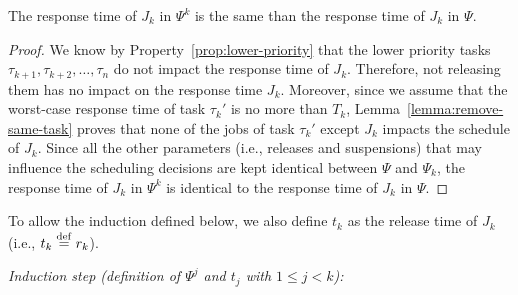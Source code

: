 \begin{Lemma}
\label{lemma:psik}
The response time of $J_k$ in $\Psi^k$ is the same than the response time of $J_k$ in $\Psi$.
\end{Lemma}
\begin{proof}
We know by Property~\ref{prop:lower-priority} that the lower priority tasks $\tau_{k+1}, \tau_{k+2}, \ldots, \tau_n$ do not impact the response time of $J_{k}$. Therefore, not releasing them has no impact on the response time $J_k$. Moreover, since we assume that the worst-case response time of task $\tau_k'$ is no more than $T_k$, Lemma~\ref{lemma:remove-same-task} proves that none of the jobs of task $\tau_k'$ except $J_{k}$ impacts the schedule of $J_{k}$. Since all the other parameters (i.e., releases and suspensions) that may influence the scheduling decisions are kept identical between $\Psi$ and $\Psi_k$, the response time of $J_{k}$ in $\Psi^{k}$ is identical to the response time of $J_{k}$ in $\Psi$.
\end{proof}

To allow the induction defined below, we also define $t_k$ as the release time of $J_k$ (i.e., $t_k \stackrel{\mathrm{def}}{=} r_k$).

\noindent\textit{Induction step (definition of $\Psi^j$ and $t_j$ with $1 \leq j < k$):}


